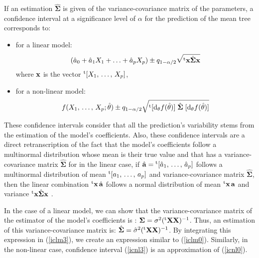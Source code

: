 If an estimation $\hat{\boldsymbol{\Sigma}}$ is given of the variance-covariance matrix of the parameters, a confidence interval at a significance level of $\alpha$ for the prediction of the mean tree corresponds to:
\begin{itemize}
\item for a linear model:
\begin{equation}
(\hat{a}_0+\hat{a}_1X_1+\ldots+\hat{a}_pX_p)\pm
q_{1-\alpha/2}\sqrt{{}^{\mathrm{t}}\mathbf{x}\hat{\boldsymbol{\Sigma}}\mathbf{x}}
\label{iclm3}
\end{equation}
where $\mathbf{x}$ is the vector ${}^{\mathrm{t}}[X_1,\,\ldots,\,X_p]$,
\item for a non-linear model:
\begin{equation}
f(X_1,\,\ldots,\,X_p;\hat{\theta})\pm q_{1-\alpha/2}
\sqrt{{}^{\mathrm{t}}[\mathrm{d}_{\theta}f(\hat{\theta})]\;\hat{\boldsymbol{\Sigma}}\;
[\mathrm{d}_{\theta}f(\hat{\theta})]}\label{icnl3}
\end{equation}
\end{itemize}
These confidence intervals consider that all the prediction's variability stems from the estimation of the model's coefficients. Also, these confidence intervals are a direct retranscription of the fact that the model's coefficients follow a multinormal distribution whose mean is their true value and that has a variance-covariance matrix $\hat{\boldsymbol{\Sigma}}$ for in the linear case, if $\hat{\mathbf{a}}={}^{\mathrm{t}}[\hat{a}_1,\,\ldots,\,\hat{a}_p]$ follows a multinormal distribution of mean ${}^{\mathrm{t}}[a_1,\,\ldots,\,a_p]$ and variance-covariance matrix $\hat{\boldsymbol{\Sigma}}$, then the linear combination ${}^{\mathrm{t}}\mathbf{x}\,\hat{\mathbf{a}}$ follows a normal distribution of mean ${}^{\mathrm{t}}\mathbf{x}\,\mathbf{a}$ and variance ${}^{\mathrm{t}}\mathbf{x}\hat{\boldsymbol{\Sigma}}\mathbf{x}$
\citep[p.85]{saporta90}.

In the case of a linear model, we can show that the variance-covariance matrix of the estimator of the model's coefficients is \citep[p.380]{saporta90}:
$\boldsymbol{\Sigma}=\sigma^2({}^{\mathrm{t}}\mathbf{X}\mathbf{X})^{-1}$. Thus, an estimation of this variance-covariance matrix is: 
$\hat{\boldsymbol{\Sigma}}=\hat{\sigma}^2({}^{\mathrm{t}}\mathbf{X}\mathbf{X})^{-1}$.
By integrating this expression in (\ref{iclm3}), we create an expression similar to (\ref{iclm0}). Similarly, in the non-linear case, confidence interval (\ref{icnl3})
is an approximation of (\ref{icnl0}).

